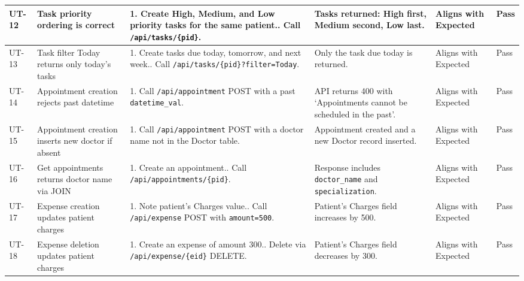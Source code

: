 \documentclass[12pt,a4paper]{article}
\begin{document}
\begin{longtable}{|p{1cm}|p{2.5cm}|p{3.5cm}|p{3.5cm}|p{2cm}|p{1.2cm}|}
    UT-12 & Task priority ordering is correct &
        1. Create High, Medium, and Low priority tasks for the same patient.\newline
        2. Call \texttt{/api/tasks/\{pid\}}. &
        Tasks returned: High first, Medium second, Low last. &
        Aligns with Expected & Pass \\
    \hline
 
    UT-13 & Task filter Today returns only today's tasks &
        1. Create tasks due today, tomorrow, and next week.\newline
        2. Call \texttt{/api/tasks/\{pid\}?filter=Today}. &
        Only the task due today is returned. &
        Aligns with Expected & Pass \\
    \hline
 
    UT-14 & Appointment creation rejects past datetime &
        1. Call \texttt{/api/appointment} POST with a past \texttt{datetime\_val}. &
        API returns 400 with `Appointments cannot be scheduled in the past'. &
        Aligns with Expected & Pass \\
    \hline
 
    UT-15 & Appointment creation inserts new doctor if absent &
        1. Call \texttt{/api/appointment} POST with a doctor name not in the Doctor table. &
        Appointment created and a new Doctor record inserted. &
        Aligns with Expected & Pass \\
    \hline
 
    UT-16 & Get appointments returns doctor name via JOIN &
        1. Create an appointment.\newline
        2. Call \texttt{/api/appointments/\{pid\}}. &
        Response includes \texttt{doctor\_name} and \texttt{specialization}. &
        Aligns with Expected & Pass \\
    \hline
 
    UT-17 & Expense creation updates patient charges &
        1. Note patient's Charges value.\newline
        2. Call \texttt{/api/expense} POST with \texttt{amount=500}. &
        Patient's Charges field increases by 500. &
        Aligns with Expected & Pass \\
    \hline
 
    UT-18 & Expense deletion updates patient charges &
        1. Create an expense of amount 300.\newline
        2. Delete via \texttt{/api/expense/\{eid\}} DELETE. &
        Patient's Charges field decreases by 300. &
        Aligns with Expected & Pass \\
    \hline
 

\end{longtable}
\end{document}
